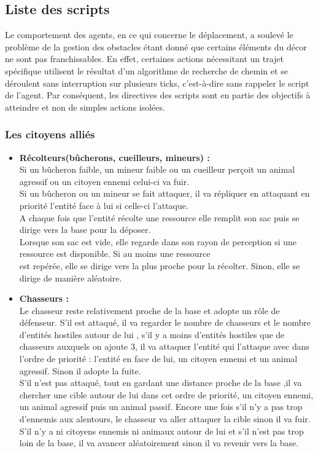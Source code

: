\documentclass[a4paper]{article}
\newcommand{\alinea}{\hspace*{0.5cm}}
\begin{document}
			
		\subsection{Liste des scripts}
		
			\alinea Le comportement des agents, en ce qui concerne le déplacement, a soulevé le problème de la gestion des obstacles étant donné que certains éléments du décor ne sont pas franchissables.
En effet, certaines actions nécessitant un trajet spécifique utilisent le résultat d'un algorithme de recherche de chemin et se déroulent sans interruption sur plusieurs ticks, c'est-à-dire sans rappeler le script de l'agent.
Par conséquent, les directives des scripts sont en partie des objectifs à atteindre et non de simples actions isolées.
   
		         \subsubsection{Les citoyens alliés}
		 	\begin{itemize} \small
		             \item \textbf{Récolteurs(bûcherons, cueilleurs, mineurs) :} \\ \alinea Si un bûcheron faible, un mineur faible ou un cueilleur perçoit un animal agressif ou un citoyen ennemi celui-ci va fuir.\\
			    Si un bûcheron ou un mineur se fait attaquer, il va répliquer en attaquant en priorité l'entité face à lui si celle-ci l'attaque.\\
			    A chaque fois que l'entité récolte une ressource elle remplit son sac puis se dirige vers la base pour la déposer.\\
			    Lorsque son sac est vide, elle regarde dans son rayon de perception si une ressource est disponible. Si au moins une ressource \\
			   est repérée, elle se dirige vers la plus proche pour la récolter. Sinon, elle se dirige de manière aléatoire.
			   
			  \item \textbf{Chasseurs :} \\ \alinea  Le chasseur reste relativement proche de la base et adopte un rôle de défenseur.
			  S'il est attaqué, il va regarder le nombre de chasseurs et le nombre d'entités hostiles autour de lui , s'il y a moins d'entités hostiles  que de 			 chasseurs auxquels on ajoute 3,  il va attaquer l'entité qui l'attaque avec dans l'ordre de priorité : l'entité en face de lui, un citoyen ennemi et 		 un animal agressif. Sinon il adopte la fuite.\\
			\alinea S'il n'est pas attaqué, tout en gardant une distance proche de la base ,il va chercher une cible autour de lui dans cet ordre de priorité, un 			 citoyen ennemi, un animal agressif puis un animal passif.
			 Encore une fois s'il n'y a pas trop d'ennemis aux alentours, le chasseur va aller attaquer la cible sinon il va fuir.
			 S'il n'y a ni citoyens ennemis ni animaux autour de lui et s'il n'est pas trop loin de la base, il va avancer aléatoirement sinon il va revenir 		 	vers la base.
		        	\end{itemize} \normalsize
		
\end{document}
